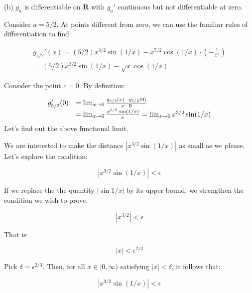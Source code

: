 \documentclass[10pt]{article}
\begin{document}
(b) $\displaystyle g_{a}$ is differentiable on $\displaystyle \mathbf{R}$ with $\displaystyle g_{a} '$ continuous but not differentiable at zero.



Consider $\displaystyle a=5/2$. At points different from zero, we can use the familiar rules of differentiation to find:


\begin{gather*}
g_{5/2} '( x) =( 5/2) x^{3/2}\sin( 1/x) -x^{5/2}\cos( 1/x) \cdot \left( -\frac{1}{x^{2}}\right)\\
=( 5/2) x^{3/2}\sin( 1/x) -\sqrt{x}\cos( 1/x)
\end{gather*}


Consider the point $\displaystyle c=0$. By definition:


\begin{equation*}
\begin{array}{ c l }
g_{5/2} '( 0) & =\lim _{x\rightarrow 0}\frac{g_{5/2}( x) -g_{5/2}( 0)}{x-0}\\
 & =\lim _{x\rightarrow 0}\frac{x^{5/2} \cdot \sin( 1/x)}{x} =\lim _{x\rightarrow 0} x^{3/2}\sin( 1/x)
\end{array}
\end{equation*}
Let's find out the above functional limit. 



We are interested to make the distance $\displaystyle |x^{3/2}\sin( 1/x) |$ as small as we please. Let's explore the condition:


\begin{equation*}
|x^{3/2}\sin( 1/x) |< \epsilon 
\end{equation*}


If we replace the the quantity $\displaystyle |\sin 1/x|$ by its upper bound, we strengthen the condition we wish to prove.


\begin{equation*}
|x^{3/2} |< \epsilon 
\end{equation*}


That is:


\begin{equation*}
|x|< \epsilon ^{2/3}
\end{equation*}


Pick $\displaystyle \delta =\epsilon ^{2/3}$. Then, for all $\displaystyle x\in [ 0,\infty )$ satisfying $\displaystyle |x|< \delta $, it follows that:




\begin{equation*}
|x^{3/2}\sin( 1/x) |< \epsilon 
\end{equation*}
\end{document}
